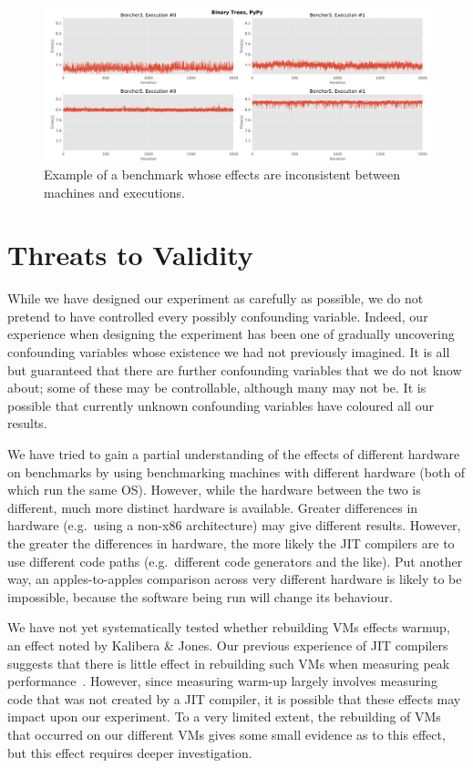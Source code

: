 \documentclass[a4paper,UKenglish]{lipics}
\newcommand{\kalibera}{Kalibera \& Jones\xspace}
\begin{document}
\begin{figure}[h!]
\centering
\includegraphics[width=\textwidth]{examples/inconsistent_weirdness1}
\caption{Example of a benchmark whose effects are inconsistent between machines and executions.}
\label{fig:examples:inconsistent_weirdness1}
\end{figure}


\section{Threats to Validity}
\label{sec:threats}

While we have designed our experiment as carefully as possible, we do not
pretend to have controlled every possibly confounding variable. Indeed, our
experience when designing the experiment has been one of gradually uncovering
confounding variables whose existence we had not previously imagined. It
is all but guaranteed that there are further confounding variables that we
do not know about; some of these may be controllable, although many may not be.
It is possible that currently unknown confounding variables have coloured all
our results.

We have tried to gain a partial understanding of the effects of different
hardware on benchmarks by using benchmarking machines with different hardware
(both of which run the same OS). However, while the hardware between the two is
different, much more distinct hardware is available. Greater differences in
hardware (e.g.~using a non-x86 architecture) may give different results.
However, the greater the differences in hardware, the more likely the JIT
compilers are to use different code paths (e.g.~different code generators and
the like). Put another way, an apples-to-apples comparison across very different
hardware is likely to be impossible, because the software being run will
change its behaviour.

We have not yet systematically tested whether rebuilding VMs effects warmup, an
effect noted by \kalibera. Our previous experience of JIT compilers suggests
that there is little effect in rebuilding such VMs when measuring peak
performance~\cite{barrett15approaches}. However, since measuring warm-up largely
involves measuring code that was not created by a JIT compiler, it is possible
that these effects may impact upon our experiment. To a very limited extent, the
rebuilding of VMs that occurred on our different VMs gives some small evidence
as to this effect, but this effect requires deeper investigation.
\end{document}
